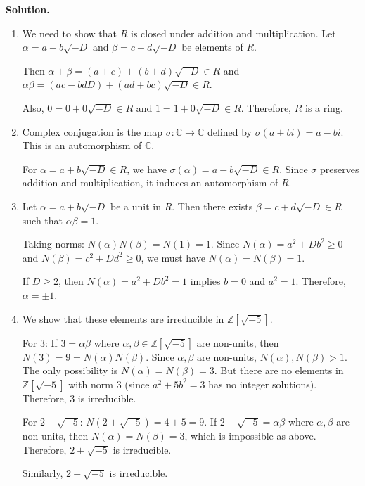 \noindent\textbf{Solution.}
\begin{enumerate}[label=(\alph*)]
    \item We need to show that $R$ is closed under addition and multiplication. Let $\alpha = a + b\sqrt{-D}$ and $\beta = c + d\sqrt{-D}$ be elements of $R$.
    
    Then $\alpha + \beta = (a + c) + (b + d)\sqrt{-D} \in R$ and $\alpha\beta = (ac - bdD) + (ad + bc)\sqrt{-D} \in R$.
    
    Also, $0 = 0 + 0\sqrt{-D} \in R$ and $1 = 1 + 0\sqrt{-D} \in R$. Therefore, $R$ is a ring.
    
    \item Complex conjugation is the map $\sigma: \mathbb{C} \rightarrow \mathbb{C}$ defined by $\sigma(a + bi) = a - bi$. This is an automorphism of $\mathbb{C}$.
    
    For $\alpha = a + b\sqrt{-D} \in R$, we have $\sigma(\alpha) = a - b\sqrt{-D} \in R$. Since $\sigma$ preserves addition and multiplication, it induces an automorphism of $R$.
    
    \item Let $\alpha = a + b\sqrt{-D}$ be a unit in $R$. Then there exists $\beta = c + d\sqrt{-D} \in R$ such that $\alpha\beta = 1$.
    
    Taking norms: $N(\alpha)N(\beta) = N(1) = 1$. Since $N(\alpha) = a^2 + Db^2 \geq 0$ and $N(\beta) = c^2 + Dd^2 \geq 0$, we must have $N(\alpha) = N(\beta) = 1$.
    
    If $D \geq 2$, then $N(\alpha) = a^2 + Db^2 = 1$ implies $b = 0$ and $a^2 = 1$. Therefore, $\alpha = \pm 1$.
    
    \item We show that these elements are irreducible in $\mathbb{Z}[\sqrt{-5}]$.
    
    For 3: If $3 = \alpha\beta$ where $\alpha, \beta \in \mathbb{Z}[\sqrt{-5}]$ are non-units, then $N(3) = 9 = N(\alpha)N(\beta)$. Since $\alpha, \beta$ are non-units, $N(\alpha), N(\beta) > 1$. The only possibility is $N(\alpha) = N(\beta) = 3$. But there are no elements in $\mathbb{Z}[\sqrt{-5}]$ with norm 3 (since $a^2 + 5b^2 = 3$ has no integer solutions). Therefore, 3 is irreducible.
    
    For $2 + \sqrt{-5}$: $N(2 + \sqrt{-5}) = 4 + 5 = 9$. If $2 + \sqrt{-5} = \alpha\beta$ where $\alpha, \beta$ are non-units, then $N(\alpha) = N(\beta) = 3$, which is impossible as above. Therefore, $2 + \sqrt{-5}$ is irreducible.
    
    Similarly, $2 - \sqrt{-5}$ is irreducible.
\end{enumerate}

